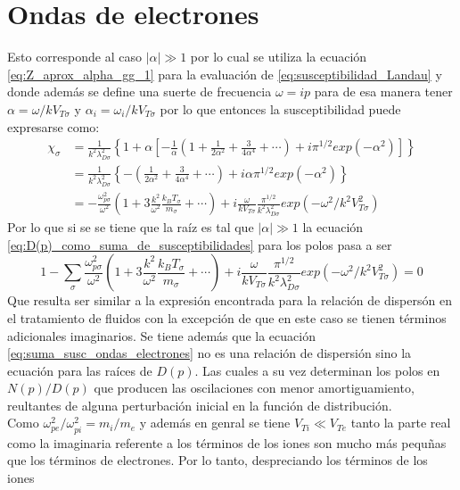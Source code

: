 \documentclass[../tesis_main_file.tex]{subfile}
\begin{document}
\section{Ondas de electrones}
Esto corresponde al caso $|\alpha| \gg 1$ por lo cual se utiliza la ecuación \ref{eq:Z_aprox_alpha_gg_1} para la evaluación de \ref{eq:susceptibilidad_Landau} y donde además se define una suerte de frecuencia $\omega = ip$ para de esa manera tener $\alpha = \omega /kV_{T\sigma}$ y  $\alpha_i = \omega_i /kV_{T\sigma}$ por lo que entonces la susceptibilidad puede expresarse como:
\begin{equation}
\label{eq:susceptibilidad_landau_ondas_electrones}
\begin{split}
\chi _{\sigma} &= \frac{1}{k^2 \lambda^2_{D\sigma}}\left\lbrace 1+\alpha \left[-\frac{1}{\alpha}\left(1+\frac{1}{2\alpha^2}+\frac{3}{4\alpha^4}+\cdots\right)+i\pi^{1/2}exp(-\alpha^2)\right]\right\rbrace\\
&=\frac{1}{k^2 \lambda^2_{D\sigma}}\left\lbrace - \left(\frac{1}{2\alpha^2}+\frac{3}{4\alpha^4}+\cdots\right) + i\alpha\pi^{1/2}exp(-\alpha^2)\right\rbrace\\
&=-\frac{\omega^2_{p\sigma}}{\omega^2}\left(1+3\frac{k^2}{\omega^2}\frac{k_BT_{\sigma}}{m_{\sigma}}+\cdots \right)+i\frac{\omega}{kV_{T\sigma}}\frac{\pi^{1/2}}{k^2\lambda^2_{D\sigma}}exp(-\omega^2/k^2V^2_{T\sigma})
\end{split}
\end{equation}
Por lo que si se se tiene que la raíz es tal que $|\alpha |\gg 1$ la ecuación \ref{eq:D(p)_como_suma_de_susceptibilidades} para los polos pasa a ser
\begin{equation}
\label{eq:suma_susc_ondas_electrones}
1-\sum_{\sigma}\frac{\omega^2_{p\sigma}}{\omega^2}\left(1+3\frac{k^2}{\omega^2}\frac{k_BT_{\sigma}}{m_{\sigma}}+\cdots \right)+i\frac{\omega}{kV_{T\sigma}}\frac{\pi^{1/2}}{k^2\lambda^2_{D\sigma}}exp(-\omega^2/k^2V^2_{T\sigma}) =0
\end{equation}
Que resulta ser similar a la expresión encontrada para la relación de dispersón en el tratamiento de fluidos con la excepción de que en este caso se tienen términos adicionales imaginarios.
Se tiene además que la ecuación \ref{eq:suma_susc_ondas_electrones} no es una relación de dispersión sino la ecuación para las raíces de $D(p)$. Las cuales a su vez determinan los polos en $N(p)/D(p)$ que producen las oscilaciones con menor amortiguamiento, reultantes de alguna perturbación inicial en la función de distribución.\\
Como $\omega^2_{pe}/\omega^2_{pi}=m_i/m_e$ y además en genral se tiene $V_{Ti} \ll V_{Te}$ tanto la parte real como la imaginaria referente a los términos de los iones son mucho más pequñas que los términos de electrones. Por lo tanto, despreciando los términos de los iones
\end{document}
